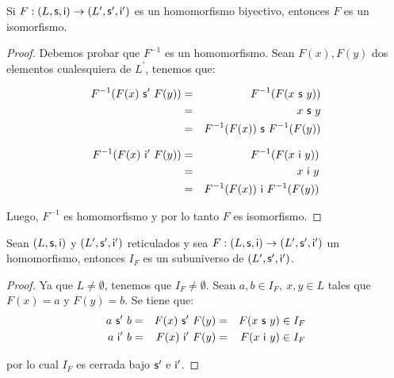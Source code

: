   \begin{lemma}
    \PN Si $F: (L, \mathsf{s}, \mathsf{i}) \rightarrow (L^{\prime}, \mathsf{s}^{\prime}, \mathsf{i}^{\prime})$ es un
    homomorfismo biyectivo, entonces $F$ es un isomorfismo.
  \end{lemma}
  \begin{proof}
    \PN Debemos probar que $F^{-1}$ es un homomorfismo. Sean $F(x), F(y)$ dos elementos cualesquiera de $L^{\prime}$,
    tenemos que:
    \begin{multicols}{2}
      \begin{eqnarray*}
        F^{-1}(F(x) \ \mathsf{s}^{\prime} \ F(y)) &=& F^{-1}(F(x \ \mathsf{s} \ y)) \\
        &=& x \ \mathsf{s} \ y \\
        &=& F^{-1}(F(x)) \ \mathsf{s} \ F^{-1}(F(y))
      \end{eqnarray*}

      \begin{eqnarray*}
        F^{-1}(F(x) \ \mathsf{i}^{\prime} \ F(y)) &=& F^{-1}(F(x \ \mathsf{i} \ y)) \\
        &=& x \ \mathsf{i} \ y \\
        &=& F^{-1}(F(x)) \ \mathsf{i} \ F^{-1}(F(y))
      \end{eqnarray*}
    \end{multicols}

    \PN Luego, $F^{-1}$ es homomorfismo y por lo tanto $F$ es isomorfismo.
  \end{proof}

  \begin{lemma} \label{lemma_6}
    \PN Sean $(L, \mathsf{s}, \mathsf{i})$ y $(L^{\prime}, \mathsf{s}^{\prime}, \mathsf{i}^{\prime})$ reticulados y sea $F: (L, \mathsf{s}, \mathsf{i})
    \rightarrow (L^{\prime}, \mathsf{s}^{\prime}, \mathsf{i}^{\prime})$ un homomorfismo, entonces $I_{F}$ es un subuniverso de
    $(L^{\prime}, \mathsf{s}^{\prime}, \mathsf{i}^{\prime})$.
  \end{lemma}
  \begin{proof}
    \PN Ya que $L \neq \emptyset$, tenemos que $I_{F} \neq \emptyset$. Sean $a, b \in I_{F}, \ x, y \in L$ tales que
    $F(x) = a$ y $F(y) = b$. Se tiene que:
    \begin{alignat*}{3}
      a \ \SU^{\prime} \ b &=& F(x) \ \SU^{\prime} \ F(y) &=& F(x \ \SU \ y) \in I_{F} \\
      a \ \IN^{\prime} \ b &=& F(x) \ \IN^{\prime} \ F(y) &=& F(x \ \IN \ y) \in I_{F}
    \end{alignat*}

    \PN por lo cual $I_{F}$ es cerrada bajo $\mathsf{s}^{\prime}$ e $\mathsf{i}^{\prime}$.
  \end{proof}

